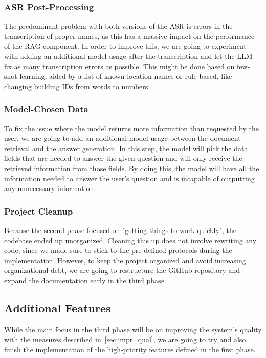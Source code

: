 \documentclass{article}
\begin{document}
\subsubsection{ASR Post-Processing} \label{sec:ASR_post_proc}
The predominant problem with both versions of the ASR is errors in the transcription of proper names, as this has a massive impact on the performance of the RAG component. In order to improve this, we are going to experiment with adding an additional model usage after the transcription and let the LLM fix as many transcription errors as possible. This might be done based on few-shot learning, aided by a list of known location names or rule-based, like changing building IDs from words to numbers.

\subsubsection{Model-Chosen Data} \label{sec:chosen_data}
To fix the issue where the model returns more information than requested by the user, we are going to add an additional model usage between the document retrieval and the answer generation. In this step, the model will pick the data fields that are needed to answer the given question and will only receive the retrieved information from those fields. By doing this, the model will have all the information needed to answer the user's question and is incapable of outputting any unnecessary information.

\subsubsection{Project Cleanup}
Because the second phase focused on "getting things to work quickly", the codebase ended up unorganized. Cleaning this up does not involve rewriting any code, since we made sure to stick to the pre-defined protocols during the implementation. However, to keep the project organized and avoid increasing organizational debt, we are going to restructure the GitHub repository and expand the documentation early in the third phase.

\subsection{Additional Features}
While the main focus in the third phase will be on improving the system's quality with the measures described in~\cref{sec:impr_qual}, we are going to try and also finish the implementation of the high-priority features defined in the first phase.
\end{document}
